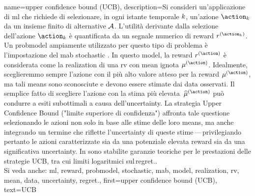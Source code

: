 {name={upper confidence bound (UCB)},
	description={Si consideri un'applicazione di \gls{ml} 
		che richiede di selezionare, in ogni istante temporale $k$, un'azione $\action_{\iteridx}$ 
		da un insieme finito di alternative  $\mathcal{A}$. L’utilità derivante dalla selezione dell’azione $\action_{\iteridx}$ 
		è quantificata da un segnale numerico di \gls{reward} $\reward^{(\action_{\iteridx})}$. 
		Un \gls{probmodel} ampiamente utilizzato per questo tipo di problema  
		è l'impostazione del \gls{mab} \gls{stochastic} \cite{Bubeck2012}. In questo \gls{model}, 
		la \gls{reward} $\reward^{(\action)}$ è considerata come la \gls{realization} di una \gls{rv} 
		con \gls{mean} ignota $\mu^{(\action)}$. Idealmente, sceglieremmo sempre l’azione con il più 
		alto valore atteso per la \gls{reward} $\mu^{(\action)}$, ma tali 
		\glspl{mean} sono sconosciute e devono essere stimate dai \gls{data} osservati. Il semplice 
		fatto di scegliere l’azione con la stima più elevata  $\widehat{\mu}^{(\action)}$ può condurre a esiti subottimali a 
		causa dell’\gls{uncertainty}. La strategia Upper Confidence Bound ("limite superiore di confidenza")
		affronta tale questione selezionando le azioni non solo in base alle stime delle loro \glspl{mean}, ma 
		anche integrando un termine che riflette l'\gls{uncertainty} di queste stime — privilegiando pertanto le azioni 
		caratterizzate sia da una potenziale elevata \gls{reward} sia da una significativa \gls{uncertainty}. 
		In \cite{Bubeck2012} sono stabilite garanzie teoriche per le prestazioni delle strategie UCB, 
		tra cui limiti logaritmici sul \gls{regret}..
					\\ 
		Si veda anche: \gls{ml}, \gls{reward}, \gls{probmodel}, \gls{stochastic}, \gls{mab}, \gls{model}, \gls{realization}, \gls{rv}, \gls{mean}, \gls{data}, \gls{uncertainty}, \gls{regret}.},
	first={upper confidence bound (UCB)},
	text={UCB} 
}

